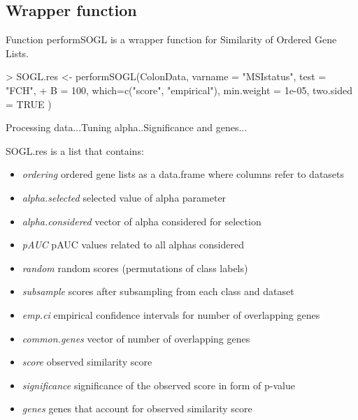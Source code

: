 \documentclass[a4paper]{report}
\begin{document}
\subsection*{Wrapper function}
Function {\ttfamily performSOGL} is a wrapper function for Similarity of Ordered Gene Lists. 
\begin{Schunk}
\begin{Sinput}
> SOGL.res <- performSOGL(ColonData, varname = "MSIstatus", test = "FCH", 
+ B = 100, which=c("score", "empirical"), min.weight = 1e-05, two.sided = TRUE )
\end{Sinput}
\begin{Soutput}
Processing data...Tuning alpha..Significance and genes...
\end{Soutput}
\end{Schunk}
{\ttfamily SOGL.res} is a list that contains:
\begin{itemize}
\item \emph{ordering} ordered gene lists as a data.frame where columns refer to datasets
\item \emph{alpha.selected} selected value of alpha parameter 
\item \emph{alpha.considered} vector of alpha considered for selection
\item \emph{pAUC} pAUC values related to all alphas considered
\item \emph{random} random scores (permutations of class labels)
\item \emph{subsample} scores after subsampling from each class and dataset
\item \emph{emp.ci} empirical confidence intervals for number of overlapping genes
\item \emph{common.genes} vector of number of overlapping genes
\item \emph{score} observed similarity score
\item \emph{significance} significance of the observed score in form of p-value
\item \emph{genes} genes that account for observed similarity score
\end{itemize}
\end{document}
